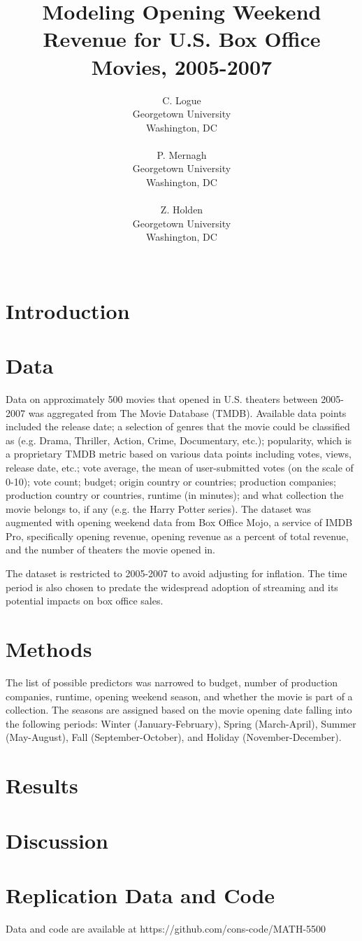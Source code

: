 \documentclass[10pt]{article}
\title{Modeling Opening Weekend Revenue for U.S. Box Office Movies, 2005-2007}
\author{
  C. Logue \\
  Georgetown University \\
  Washington, DC \\
\\\And
  P. Mernagh \\
  Georgetown University \\
  Washington, DC \\
\\\And
  Z. Holden \\
  Georgetown University \\
  Washington, DC \\
\\}
\begin{document}
\maketitle

\section{Introduction}

\section{Data}

Data on approximately 500 movies that opened in U.S. theaters between 2005-2007 was aggregated from The Movie Database (TMDB). Available data points included the release date; a selection of genres that the movie could be classified as (e.g. Drama, Thriller, Action, Crime, Documentary, etc.); popularity, which is a proprietary TMDB metric based on various data points including votes, views, release date, etc.; vote average, the mean of user-submitted votes (on the scale of 0-10); vote count; budget; origin country or countries; production companies; production country or countries, runtime (in minutes); and what collection the movie belongs to, if any (e.g. the Harry Potter series). The dataset was augmented with opening weekend data from Box Office Mojo, a service of IMDB Pro, specifically opening revenue, opening revenue as a percent of total revenue, and the number of theaters the movie opened in. 

The dataset is restricted to 2005-2007 to avoid adjusting for inflation. The time period is also chosen to predate the widespread adoption of streaming and its potential impacts on box office sales. 


\section{Methods}

The list of possible predictors was narrowed to budget, number of production companies, runtime, opening weekend season, and whether the movie is part of a collection. 
The seasons are assigned based on the movie opening date falling into the following periods: Winter (January-February), Spring (March-April), Summer (May-August), Fall (September-October), and Holiday (November-December). 


\section{Results}

\section{Discussion}

%

\appendix

\section{Replication Data and Code}
\label{a:code}
Data and code are available at https://github.com/cons-code/MATH-5500
\end{document}
